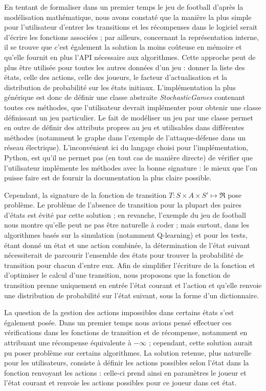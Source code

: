 \documentclass{article}
\begin{document}
En tentant de formaliser dans un premier temps le jeu de football d'après la modélisation mathématique, nous avons constaté que la manière la plus simple pour l'utilisateur d'entrer les transitions et les récompenses dans le logiciel serait d'écrire les fonctions associées ; par ailleurs, concernant la représentation interne, il se trouve que c'est également la solution la moins coûteuse en mémoire et qu'elle fournit en plus l'API nécessaire aux algorithmes. Cette approche peut de plus être utilisée pour toutes les autres données d'un jeu : donner la liste des états, celle des actions, celle des joueurs, le facteur d'actualisation et la distribution de probabilité sur les états initiaux. L'implémentation la plus générique est donc de définir une classe abstraite \textit{StochasticGames} contenant toutes ces méthodes, que l'utilisateur devrait implémenter pour obtenir une classe définissant un jeu particulier. Le fait de modéliser un jeu par une classe permet en outre de définir des attributs propres au jeu et utilisables dans différentes méthodes (notamment le graphe dans l'exemple de l'attaque-défense dans un réseau électrique). L'inconvénient ici du langage choisi pour l'implémentation, Python, est qu'il ne permet pas (en tout cas de manière directe) de vérifier que l'utilisateur implémente les méthodes avec la bonne signature : le mieux que l'on puisse faire est de fournir la documentation la plus claire possible.

Cependant, la signature de la fonction de transition \(T : S \times A \times S' \mapsto \Re\) pose problème. Le problème de l'absence de transition pour la plupart des paires d'états est évité par cette solution ; en revanche, l'exemple du jeu de football nous montre qu'elle peut ne pas être naturelle à coder ; mais surtout, dans les algorithmes basés sur la simulation (notamment Q-learning) et pour les tests, étant donné un état et une action combinée, la détermination de l'état suivant nécessiterait de parcourir l'ensemble des états pour trouver la probabilité de transition pour chacun d'entre eux. Afin de simplifier l'écriture de la fonction et d'optimiser le calcul d'une transition, nous proposons que la fonction de transition prenne uniquement en entrée l'état courant et l'action et qu'elle renvoie une distribution de probabilité sur l'état suivant, sous la forme d'un dictionnaire.

La question de la gestion des actions impossibles dans certains états s'est également posée. Dans un premier temps nous avions pensé effectuer ces vérifications dans les fonctions de transition et de récompense, notamment en attribuant une récompense équivalente à \(-\infty\) ; cependant, cette solution aurait pu poser problème sur certains algorithmes. La solution retenue, plus naturelle pour les utilisateurs, consiste à définir les actions possibles selon l'état dans la fonction renvoyant les actions : celle-ci prend ainsi en paramètres le joueur et l'état courant et renvoie les actions possibles pour ce joueur dans cet état.
\end{document}
